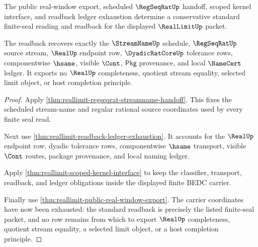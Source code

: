 \begin{theorem}
\label{thm:reallimit-standard-finite-seal-bridge}
The public real-window export, scheduled $\RegSeqRatUp$ handoff, scoped kernel
interface, and readback ledger exhaustion determine a conservative standard
finite-seal reading and readback for the displayed $\RealLimitUp$ packet.

The readback recovers exactly the $\StreamNameUp$ schedule, $\RegSeqRatUp$
source stream, $\RealUp$ endpoint row, $\DyadicRatCoreUp$ tolerance rows,
componentwise $\hsame$, visible $\Cont$, $\mathsf{Pkg}$ provenance, and local
$\NameCert$ ledger. It exports no $\RealUp$ completeness, quotient stream
equality, selected limit object, or host completion principle.
\end{theorem}
\begin{proof}
Apply \autoref{thm:reallimit-regseqrat-streamname-handoff}. This fixes the
scheduled stream-name and regular rational source coordinates used by every
finite seal read.

Next use \autoref{thm:reallimit-readback-ledger-exhaustion}. It accounts for the
$\RealUp$ endpoint row, dyadic tolerance rows, componentwise $\hsame$ transport,
visible $\Cont$ routes, package provenance, and local naming ledger.

Apply \autoref{thm:reallimit-scoped-kernel-interface} to keep the classifier,
transport, readback, and ledger obligations inside the displayed finite BEDC
carrier.

Finally use \autoref{thm:reallimit-public-real-window-export}. The carrier
coordinates have now been exhausted: the standard readback is precisely the
listed finite-seal packet, and no row remains from which to export $\RealUp$
completeness, quotient stream equality, a selected limit object, or a host
completion principle.
\end{proof}

